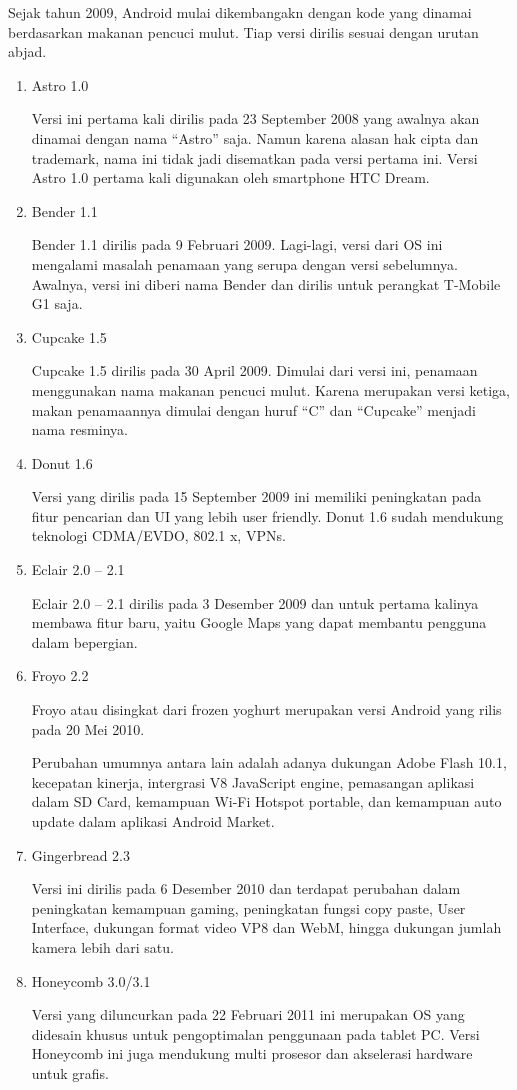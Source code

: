 \par Sejak tahun 2009, Android mulai dikembangakn dengan kode yang dinamai berdasarkan makanan pencuci mulut. Tiap versi dirilis sesuai dengan urutan abjad.
\begin{enumerate}
    \item Astro 1.0
    \par Versi ini pertama kali dirilis pada 23 September 2008 yang awalnya akan dinamai dengan nama “Astro” saja. Namun karena alasan hak cipta dan trademark, nama ini tidak jadi disematkan pada versi pertama ini. Versi Astro 1.0 pertama kali digunakan oleh smartphone HTC Dream.
    \item Bender 1.1
    \par Bender 1.1 dirilis pada 9 Februari 2009. Lagi-lagi, versi dari OS ini mengalami masalah penamaan yang serupa dengan versi sebelumnya. Awalnya, versi ini diberi nama Bender dan dirilis untuk perangkat T-Mobile G1 saja.
    \item Cupcake 1.5
    \par Cupcake 1.5 dirilis pada 30 April 2009. Dimulai dari versi ini, penamaan menggunakan nama makanan pencuci mulut. Karena merupakan versi ketiga, makan penamaannya dimulai dengan huruf “C” dan “Cupcake” menjadi nama resminya.
    \item Donut 1.6
    \par Versi yang dirilis pada 15 September 2009 ini memiliki peningkatan pada fitur pencarian dan UI yang lebih user friendly. Donut 1.6 sudah mendukung teknologi CDMA/EVDO, 802.1 x, VPNs.
    \item Eclair 2.0 – 2.1
    \par Eclair 2.0 – 2.1 dirilis pada 3 Desember 2009 dan untuk pertama kalinya membawa fitur baru, yaitu Google Maps yang dapat membantu pengguna dalam bepergian.
    \item Froyo 2.2
    \par Froyo atau disingkat dari frozen yoghurt merupakan versi Android yang rilis pada 20 Mei 2010.

\par Perubahan umumnya antara lain adalah adanya dukungan Adobe Flash 10.1, kecepatan kinerja, intergrasi V8 JavaScript engine, pemasangan aplikasi dalam SD Card, kemampuan Wi-Fi Hotspot portable, dan kemampuan auto update dalam aplikasi Android Market.

\item Gingerbread 2.3
\par Versi ini dirilis pada 6 Desember 2010 dan terdapat perubahan dalam peningkatan kemampuan gaming, peningkatan fungsi copy paste, User Interface, dukungan format video VP8 dan WebM, hingga dukungan jumlah kamera lebih dari satu.
\item Honeycomb 3.0/3.1
\par Versi yang diluncurkan pada 22 Februari 2011 ini merupakan OS yang didesain khusus untuk pengoptimalan penggunaan pada tablet PC. Versi Honeycomb ini juga mendukung multi prosesor dan akselerasi hardware untuk grafis.


\end{enumerate}
